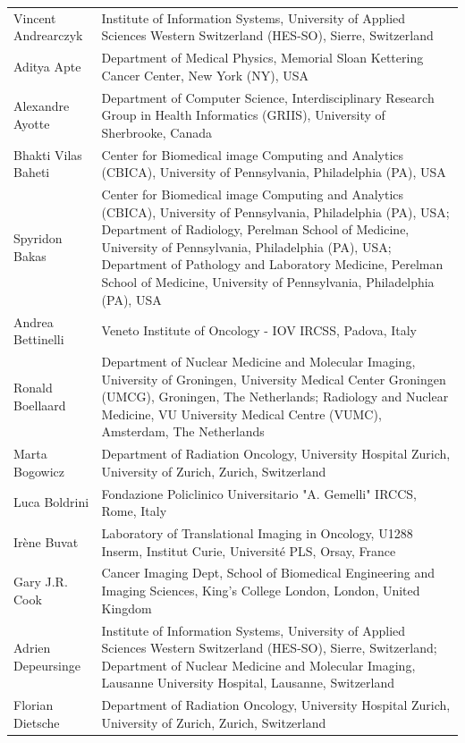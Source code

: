 \documentclass[fleqn,a4paper,oneside,openany]{book}
\begin{document}
\begin{longtable}{p{4cm}p{10cm}}
\\
\endlastfoot
Vincent Andrearczyk
& Institute of Information Systems, University of Applied Sciences Western Switzerland (HES-SO), Sierre, Switzerland\\ 
Aditya Apte
& Department of Medical Physics, Memorial Sloan Kettering Cancer Center, New York (NY), USA\\ 
Alexandre Ayotte
& Department of Computer Science, Interdisciplinary Research Group in Health Informatics (GRIIS), University of Sherbrooke, Canada\\ 
Bhakti Vilas Baheti
& Center for Biomedical image Computing and Analytics (CBICA), University of Pennsylvania, Philadelphia (PA), USA\\ 
Spyridon Bakas
& Center for Biomedical image Computing and Analytics (CBICA), University of Pennsylvania, Philadelphia (PA), USA; Department of Radiology, Perelman School of Medicine, University of Pennsylvania, Philadelphia (PA), USA; Department of Pathology and Laboratory Medicine, Perelman School of Medicine, University of Pennsylvania, Philadelphia (PA), USA\\
Andrea Bettinelli & Veneto Institute of Oncology - IOV IRCSS, Padova, Italy\\
Ronald Boellaard
& Department of Nuclear Medicine and Molecular Imaging, University of Groningen, University Medical Center Groningen (UMCG), Groningen, The Netherlands; Radiology and Nuclear Medicine, VU University Medical Centre (VUMC), Amsterdam, The Netherlands\\ 
Marta Bogowicz
& Department of Radiation Oncology, University Hospital Zurich, University of Zurich, Zurich, Switzerland\\ 
Luca Boldrini
& Fondazione Policlinico Universitario "A. Gemelli" IRCCS, Rome, Italy\\ 
Irène Buvat
& Laboratory of Translational Imaging in Oncology, U1288 Inserm, Institut Curie, Université PLS, Orsay, France \\ 
Gary J.R. Cook
& Cancer Imaging Dept, School of Biomedical Engineering and Imaging Sciences, King’s College London, London, United Kingdom\\ 
Adrien Depeursinge
& Institute of Information Systems, University of Applied Sciences Western Switzerland (HES-SO), Sierre, Switzerland; Department of Nuclear Medicine and Molecular Imaging, Lausanne University Hospital, Lausanne, Switzerland\\ 
Florian Dietsche
& Department of Radiation Oncology, University Hospital Zurich, University of Zurich, Zurich, Switzerland\\ 

\end{longtable}
\end{document}
